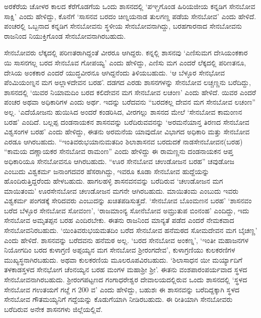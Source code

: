 ಅರಕೆರೆಯ ಚೋಳರ ಕಾಲದ ಕೆರೆಗೊಡಗೆಯ ಒಂದು ಶಾಸನದಲ್ಲಿ ‘ಪಞ್ಚಗೊಂಡ ಹಿರಿಯಜೀಯ ಕನ್ನಡಿಗ ಸೇನಬೋವ ಸಾಕ್ಷಿ’ ಎಂದು ಹೇಳಿದ್ದು, ಕೊನೆಗೆ ‘ಸಾಸನವ ಬರದಂ ಚಿಣ್ನಯನಾಡ ತುಲಗಣ್ಡ ಪಡೆಯ ಸೇನಬೋವ’ ಎಂದು ಹೇಳಿದೆ. ಪಂಚರಲ್ಲಿ ಒಬ್ಬನಾದ ಕನ್ನಡಿಗ ಸೇನಬೋವನು ಸ್ಥಳೀಯ ಸೇನಬೋವನಾಗಿದ್ದು, ಬರಹಗಾರನಾದ ಸೇನಬೋವನು ರಾಜನಿಂದ ನಿಯುಕ್ತಿಗೊಂಡ ಸೇನಬೋವನಾಗಿರಬಹುದು.

ಸೇನಬೋವರು ಲೆಕ್ಕದಲ್ಲಿ ಪರಿಣತರಾಗಿದ್ದಂತೆ ವೀರರೂ ಆಗಿದ್ದರು. ಕನ್ನಲ್ಲಿ ಶಾಸನವು ‘ಎಣಿಸುಮಗ ದೇಸಿಯಂಕಕಾರ ಯಿ ಸಾಸನಗಲ್ಲ ಬರದ ಸೇನಬೊವ ಗೋಪಯ್ಯ’ ಎಂದು ಹೇಳಿದ್ದು, ಎಣಿಸು ಮಗ ಎಂದರೆ ಲೆಕ್ಕದಲ್ಲಿ ಪರಿಣತನೂ, ದೇಸಿಯ ಅಂಕಕಾರ ಎಂದರೆ ಯುದ್ಧವೀರನೂ ಆಗಿದ್ದನೆಂದು ತಿಳಿಯಬಹುದು. ‘ಆ ಬೆಳ್ಳೂರ ಸೇನಭೋವ ಪೆಂಮಿಯಂಣ್ನನ ಮಗ ಅಲ್ಲಾಳದೇವನ ಬರಹ’. ದಡಗದ ಎರಡು ಶಾಸನಗಳನ್ನು ಸೇನಬೋವ ಲಚ್ಚಣ್ಣನು ಬರೆದಿದ್ದು, ಶಾಸನದಲ್ಲಿ ‘ಯಿವರ ನಿಯಾಮದಿಂ ಬರದ ಕಲಿದೇವನ ಮಗ ಸೇನಬೋವ ಲಚಂಣ’ ಎಂದು ಹೇಳಿದೆ. ಯಿವರ ಎಂದರೆ ಪಂಚರ ಅಥವಾ ಅಧಿಕಾರಿಗಳ ಎಂದು ಅರ್ಥ. ಇದನ್ನು ಬರೆದವನು “ಬರದಕಲ್ಲ ದೇವನ ಮಗ ಸೇನಬೋವ ಲಚಂಣ” ಅಲ್ಲ. ‘ಎದೆಯೋಜನು ಹುಯಿಸಿದ ಅಂದರೆ ಕಂಡರಿಸಿದ, ವೀರಗಲ್ಲು ಶಾಸನದ ಮೇಲೆ ‘ಸೇನಬೋವ ಕಾಮಂಣನ ಬರಹ’ ಎಂದಿದೆ. ಬಲ್ಲಪ್ಪ ದಂಡನಾಯಕನ ಶಾಸನವನ್ನು ಬರೆದಿರುವವನನ್ನು ‘ಅರಮನೆಯಾನ್ತ ತಿರಣದ ಸೇನಬೋವ ವಿಶ್ವಸಂಗಳ ಬರಹ’ ಎಂದು ಹೇಳಿದ್ದು, ಈತನು ಅರಮನೆಯ ಯಾವುದೋ ವಿಭಾಗದ ಅಧಿಕಾರಿ ಮತ್ತು ಸೇನಬೋವ ಎರಡೂ ಆಗಿರಬಹುದು. “ಇಂತಿವರುಭಯಾನುಮತದಿಂ ಶಿಲಾಶಾಸನವ ಬರದುದಕೆ ನಾಡಸೇನಬೋವನ(ಬರಹ) “ಕಾಮಯ ದಣ್ಣಾಯಕರ ಸೇನಬೋವ ರಾಮಂಣ” ಎಂದು ಹೇಳಿದ್ದು ಈ ರಾಮಣ್ಣನು ದಂಡನಾಯಕನ ಆಪ್ತ ಅಧಿಕಾರಿಯೂ ಸೇನಬೋವನೂ ಆಗಿರಬಹುದು. “ಊರ ಸೇನಬೋವ ಚಉಡೋಜನ ಬರಹ” ಚವುಡೋಜ ಎಂಬುದು ವಿಶ್ವಕರ್ಮ ಜನಾಂಗದವರ ಹೆಸರಾಗಿದ್ದು, ಇವರೂ ಕೂಡಾ ಸೇನಬೋವ ಹುದ್ದೆಯನ್ನು ಹೊಂದಿರುತ್ತಿದ್ದರೆಂದು ಹೇಳಬಹುದು. ಹಾಗಲಹಳ್ಳಿ ಶಾಸನವನವನ್ನು ಬರೆದಿರುವ ‘ಚಉಡೋಜನ ಮಗ ಮಾಯಿತಂಮ’ ಊರಸೇನಬೋವ ಚಉಡೋಜನ ಮಗನೇ ಆಗಿರಬಹುದು. ಮಾಯಿತಂಮ ಎಂಬುದು ಇವರು ವಿಶ್ವಕರ್ಮ ಪಂಗಡಕ್ಕೆ ಸೇರಿದವರು ಎಂಬುದನ್ನು ಖಚಿತಪಡಿಸುತ್ತದೆ. ‘ಸೇನಬೋವ ಬೊಂಮಣನ ಬರಹ’ ‘ಶಾಸನವಂ ಬರೆದ ಬೆಳ್ಳೂರ ಸೇನಬೋವ ಸೋವಂಣ’, ‘ರಾಜಮಾಂನ್ಯ ಸೋನೆಬೋವ ಅಮ್ರುತುಪ ಬಿಂನಂಹ’ ಎಂದಿದ್ದು, ಇದು ಸೇನಬೋವ ಅಮೃತಪ್ಪನ ಬರಹ ಎಂದಿರಬೇಕು. ಈತನು ರಾಜನಿಂದ ಮಾನ್ಯತೆ ಪಡೆದ ಎಂದರೆ ನೇಮಕವಾದ ಸೇನಬೋವನಿರಬಹುದು. ‘ಯಿಂತಿವರುಭಯಮತದಿಂ ಬರೆದ ಸೇನಬೋವ ಹನೆಮಠದ ಸೋಮದೇವನ ಮಗ ಬೈಚಣ್ಣ’ ಎಂದು ಹೇಳಿದೆ. ಶಾಸನವನ್ನು ಬರೆದವನು ಹನೆಮಠ ಅಲ್ಲ. ‘ಬರದ ಸೇನಬೋವ ಅಂಕಣ್ನ’, ‘ಇಂತೀ ಮಹಾಜನಗಳ ನಿಯೋಗದಿಂ ಬರದ ಕುಳಾಗ್ರಣಿ ಅಪ್ಪಯ್ಯನ ಮಗ ಸೇನಬೋವ ಶ‍್ರೀರಂಗದೇವ’, ಕುಳಾಗ್ರಣಿಯು ಕುಲಕರಣಿಗಳ ಮುಖ್ಯಸ್ಥನಾಗಿರಬಹುದು. ಅಥವಾ ಕುಲಕರಣಿಯ ಮೂಲರೂಪವಿರಬಹುದು. ‘ಶಿಲಾಸಾಧನ ಯೀ ಮರ್ಯ್ಯಾದಿಗೆ ತಳಕಾಡಸ್ತಳದ ಸೇನಭೋಗ ಚೆಂನಯ್ಯನ ಬರಹ ಮಂಗಳ ಮಹಾಶ‍್ರೀ ಶ‍್ರೀ’. ಈತನು ವಂಶಪಾರಂಪರ್ಯವಾದ ಸ್ಥಳದ ಸೇನಬೋವನಾಗಿರಬಹುದು. ಶ‍್ರೀರಂಗಪಟ್ಟಣದ ಗಂಗಾಧರೇಶ್ವರ ದೇವಾಲಯದಲ್ಲಿರುವ ಒಂದು ಶಾಸನದಲ್ಲಿ ‘ಸ್ಥಳದ ಸೇನಬೋವ ಗಉತಯಗೆ ಗೞ್ದೆ ಗ 200 ವ’ ಎಂದು ಹೇಳಿದ್ದು, ಬಹುಶಃ ಈ ಶಾಸನವನ್ನು ಬರೆದಿದ್ದಕ್ಕಾಗಿ ಸ್ಥಳದ ಸೇನಬೋವ ಗೌತಮಯ್ಯನಿಗೆ ಗದ್ದೆಯನ್ನು ಕೊಡುಗೆಯಾಗಿ ನೀಡಿರಬಹುದು. ಈ ರೀತಿಯಾಗಿ ಸೇನಬೋವರು ಬರೆದಿರುವ ಅನೇಕ ಶಾಸನಗಳು ಜಿಲ್ಲೆಯಲ್ಲಿವೆ.


